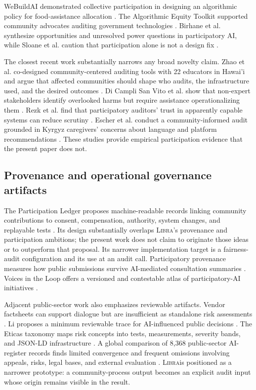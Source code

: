 \documentclass[10pt]{article}
\newcommand{\libra}{\textsc{Libra}}
\begin{document}
WeBuildAI demonstrated collective participation in designing an algorithmic
policy for food-assistance allocation \cite{lee2019}. The Algorithmic Equity
Toolkit supported community advocates auditing government technologies
\cite{katell2020}. Birhane et al. synthesize opportunities and unresolved power
questions in participatory AI, while Sloane et al. caution that participation
alone is not a design fix \cite{birhane2022,sloane2022}.

The closest recent work substantially narrows any broad novelty claim. Zhao et
al. co-designed community-centered auditing tools with 22 educators in Hawai'i
and argue that affected communities should shape who audits, the infrastructure
used, and the desired outcomes \cite{zhao2026}. Di Campli San Vito et al. show
that non-expert stakeholders identify overlooked harms but require assistance
operationalizing them \cite{dicampli2026}. Rezk et al. find that participatory
auditors' trust in apparently capable systems can reduce scrutiny
\cite{rezk2026}. Escher et al. conduct a community-informed audit grounded in
Kyrgyz caregivers' concerns about language and platform recommendations
\cite{escher2026}. These studies provide empirical participation evidence that
the present paper does not.

\subsection{Provenance and operational governance artifacts}

The Participation Ledger proposes machine-readable records linking community
contributions to consent, compensation, authority, system changes, and
replayable tests \cite{mushkani2026ledger}. Its design substantially overlaps
\libra's provenance and participation ambitions; the present work does not
claim to originate those ideas or to outperform that proposal. Its narrower
implementation target is a fairness-audit configuration and its use at an
audit call. Participatory provenance measures
how public submissions survive AI-mediated consultation summaries
\cite{mahajan2026}. Voices in the Loop offers a versioned and contestable atlas
of participatory-AI initiatives \cite{mushkani2026voices}.

Adjacent public-sector work also emphasizes reviewable artifacts. Vendor
factsheets can support dialogue but are insufficient as standalone risk
assessments \cite{kuehnert2026}. Li proposes a minimum reviewable trace for
AI-influenced public decisions \cite{li2026}. The Eticas taxonomy maps risk
concepts into tests, measurements, severity bands, and JSON-LD infrastructure
\cite{galdon2026}. A global comparison of 8,368 public-sector AI-register
records finds limited convergence and frequent omissions involving appeals,
risks, legal bases, and external evaluation \cite{das2026}. \libra is positioned
as a narrower prototype: a community-process output becomes an explicit audit
input whose origin remains visible in the result.
\end{document}
